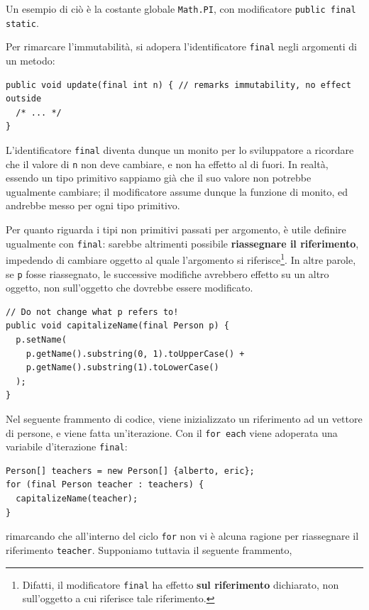 \documentclass[\fontsizeclass,twocolumn]{\classname}
\theoremstyle{definition}
\theoremstyle{definition}
\begin{document}
Un esempio di ciò è la costante globale \texttt{Math.PI}, con modificatore
\texttt{public final static}.

Per rimarcare l'immutabilità, si adopera l'identificatore \texttt{final} negli
argomenti di un metodo:

\begin{lstlisting}
public void update(final int n) { // remarks immutability, no effect outside
  /* ... */
}
\end{lstlisting}

L'identificatore \texttt{final} diventa dunque un monito per lo sviluppatore a
ricordare che il valore di \texttt{n} non deve cambiare, e non ha effetto al di
fuori. In realtà, essendo un tipo primitivo sappiamo già che il suo valore non
potrebbe ugualmente cambiare; il modificatore assume dunque la funzione di
monito, ed andrebbe messo per ogni tipo primitivo.

Per quanto riguarda i tipi non primitivi passati per argomento, è utile
definire ugualmente con \texttt{final}: sarebbe altrimenti possibile
\textbf{riassegnare il riferimento}, impedendo di cambiare oggetto al quale
l'argomento si riferisce\footnote{Difatti, il modificatore \texttt{final} ha
effetto \textbf{sul riferimento} dichiarato, non sull'oggetto a cui
riferisce tale riferimento.}. In altre parole, se \texttt{p} fosse riassegnato,
le successive modifiche avrebbero effetto su un altro oggetto, non sull'oggetto
che dovrebbe essere modificato.

\begin{lstlisting}
// Do not change what p refers to!
public void capitalizeName(final Person p) {
  p.setName(
    p.getName().substring(0, 1).toUpperCase() +
    p.getName().substring(1).toLowerCase()
  );
}
\end{lstlisting}

Nel seguente frammento di codice, viene inizializzato un riferimento ad un
vettore di persone, e viene fatta un'iterazione. Con il \texttt{for each} viene
adoperata una variabile d'iterazione \texttt{final}:

\begin{lstlisting}
Person[] teachers = new Person[] {alberto, eric};
for (final Person teacher : teachers) {
  capitalizeName(teacher);
}
\end{lstlisting}

rimarcando che all'interno del ciclo \texttt{for} non vi è alcuna ragione per
riassegnare il riferimento \texttt{teacher}. Supponiamo tuttavia il seguente
frammento,
\end{document}
